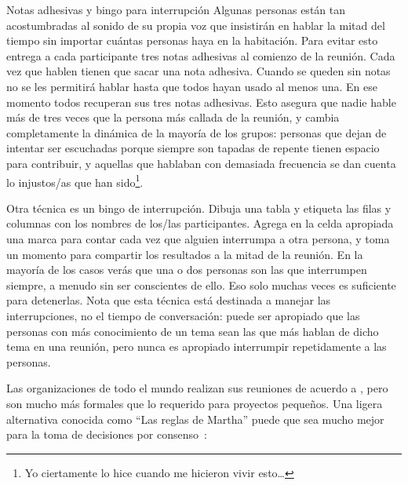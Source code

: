 \begin{aside}{Notas adhesivas y bingo para interrupción}
  Algunas personas están tan acostumbradas al sonido de su propia voz
  que insistirán en hablar la mitad del tiempo
  sin importar cuántas personas haya en la habitación.
  Para evitar esto
  entrega a cada participante tres notas adhesivas al comienzo de la reunión.
  Cada vez que hablen
  tienen que sacar una nota adhesiva.
  Cuando se queden sin notas
  no se les permitirá hablar hasta que todos hayan usado al menos una.
  En ese momento todos recuperan sus tres notas adhesivas.
  Esto asegura que nadie hable más de tres veces que
  la persona más callada de la reunión,
  y cambia completamente la dinámica de la mayoría de los grupos:
  personas que dejan de intentar ser escuchadas porque siempre son tapadas
  de repente tienen espacio para contribuir,
  y aquellas que hablaban con demasiada frecuencia se dan cuenta lo injustos/as que han sido\footnote{
    Yo ciertamente lo hice cuando me hicieron vivir esto{\ldots}
  }.

  Otra técnica es un bingo de interrupción.
  Dibuja una tabla y etiqueta las filas y columnas con los nombres de los/las participantes.
  Agrega en la celda apropiada una marca para contar 
  cada vez que alguien interrumpa a otra persona,
  y toma un momento para compartir los resultados a la mitad de la reunión.
  En la mayoría de los casos
  verás que una o dos personas son las que interrumpen siempre,
  a menudo sin ser conscientes de ello.
  Eso solo muchas veces es suficiente para detenerlas.
  Nota que esta técnica está destinada a manejar las interrupciones,
  no el tiempo de conversación:
  puede ser apropiado que las personas con más conocimiento de un tema 
  sean las que más hablan de dicho tema en una reunión,
  pero nunca es apropiado interrumpir repetidamente a las personas.
\end{aside}


Las organizaciones de todo el mundo realizan sus reuniones de acuerdo a 
,
pero son mucho más formales que lo requerido para proyectos pequeños.
Una ligera alternativa conocida como ``Las reglas de Martha''
puede que sea mucho mejor para la toma de decisiones por consenso~\cite{Mina1986}:

